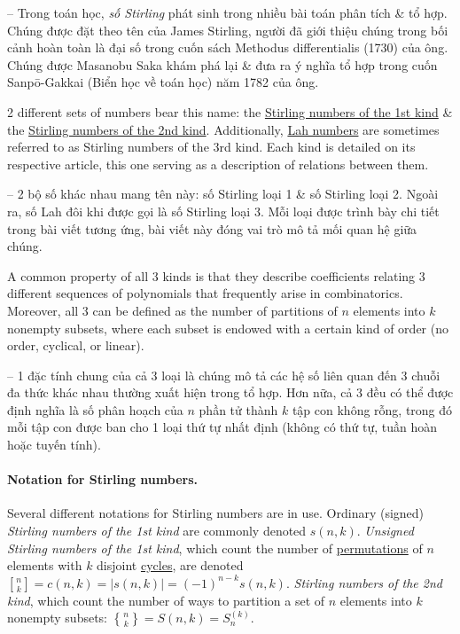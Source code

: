 \documentclass[oneside]{book}
\newcommand{\genstirlingI}[3]{%
	\genfrac{[}{]}{0pt}{#1}{#2}{#3}%
}
\newcommand{\genstirlingII}[3]{%
	\genfrac{\{}{\}}{0pt}{#1}{#2}{#3}%
}
\newcommand{\stirlingI}[2]{\genstirlingI{}{#1}{#2}}
\newcommand{\stirlingII}[2]{\genstirlingII{}{#1}{#2}}
\begin{document}
-- Trong toán học, {\it số Stirling} phát sinh trong nhiều bài toán phân tích \& tổ hợp. Chúng được đặt theo tên của {\sc James Stirling}, người đã giới thiệu chúng trong bối cảnh hoàn toàn là đại số trong cuốn sách {\sc Methodus differentialis} (1730) của ông. Chúng được {\sc Masanobu Saka} khám phá lại \& đưa ra ý nghĩa tổ hợp trong cuốn {\sc Sanpō-Gakkai (Biển học về toán học)} năm 1782 của ông.

2 different sets of numbers bear this name: the \href{https://en.wikipedia.org/wiki/Stirling_numbers_of_the_first_kind}{Stirling numbers of the 1st kind} \& the \href{https://en.wikipedia.org/wiki/Stirling_numbers_of_the_second_kind}{Stirling numbers of the 2nd kind}. Additionally, \href{https://en.wikipedia.org/wiki/Lah_numbers}{Lah numbers} are sometimes referred to as Stirling numbers of the 3rd kind. Each kind is detailed on its respective article, this one serving as a description of relations between them.

-- 2 bộ số khác nhau mang tên này: số Stirling loại 1 \& số Stirling loại 2. Ngoài ra, số Lah đôi khi được gọi là số Stirling loại 3. Mỗi loại được trình bày chi tiết trong bài viết tương ứng, bài viết này đóng vai trò mô tả mối quan hệ giữa chúng.

A common property of all 3 kinds is that they describe coefficients relating 3 different sequences of polynomials that frequently arise in combinatorics. Moreover, all 3 can be defined as the number of partitions of $n$ elements into $k$ nonempty subsets, where each subset is endowed with a certain kind of order (no order, cyclical, or linear).

-- 1 đặc tính chung của cả 3 loại là chúng mô tả các hệ số liên quan đến 3 chuỗi đa thức khác nhau thường xuất hiện trong tổ hợp. Hơn nữa, cả 3 đều có thể được định nghĩa là số phân hoạch của $n$ phần tử thành $k$ tập con không rỗng, trong đó mỗi tập con được ban cho 1 loại thứ tự nhất định (không có thứ tự, tuần hoàn hoặc tuyến tính).

\paragraph*{Notation for Stirling numbers.} Several different notations for Stirling numbers are in use. Ordinary (signed) {\it Stirling numbers of the 1st kind} are commonly denoted $s(n,k)$. {\it Unsigned Stirling numbers of the 1st kind}, which count the number of \href{https://en.wikipedia.org/wiki/Permutation}{permutations} of $n$ elements with $k$ disjoint \href{https://en.wikipedia.org/wiki/Cyclic_permutation}{cycles}, are denoted $\stirlingI{n}{k} = c(n,k) = |s(n,k)| = (-1)^{n-k}s(n,k)$. {\it Stirling numbers of the 2nd kind}, which count the number of ways to partition a set of $n$ elements into $k$ nonempty subsets: $\stirlingII{n}{k} = S(n,k) = S_n^{(k)}$.
\end{document}
